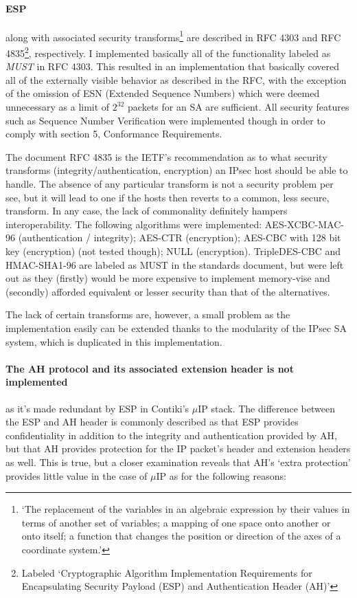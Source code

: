 \documentclass[final,a4paper,twoside,11pt,onecolumn]{report}
\begin{document}
\paragraph{ESP} along with associated security transforms\footnote{`The replacement of the variables in an algebraic expression by their values in terms of another set of variables; a mapping of one space onto another or onto itself; a function that changes the position or direction of the axes of a coordinate system.'\cite{wiki:transforms}} are described in RFC 4303\cite{rfc4303} and RFC 4835\cite{rfc4835}\footnote{Labeled `Cryptographic Algorithm Implementation Requirements for Encapsulating Security Payload (ESP) and Authentication Header (AH)'}, respectively. I implemented basically all of the functionality labeled as \emph{MUST} in RFC 4303. This resulted in an implementation that basically covered all of the externally visible behavior as described in the RFC, with the exception of the omission of ESN (Extended Sequence Numbers) which were deemed unnecessary as a limit of $2^{32}$ packets for an SA are sufficient. All security features such as Sequence Number Verification\citep[3.4.3]{rfc4303} were implemented though in order to comply with section 5, Conformance Requirements\citep[section 5]{rfc4303}.

The document RFC 4835 is the IETF's recommendation as to what security transforms (integrity/authentication, encryption) an IPsec host should be able to handle. The absence of any particular transform is not a security problem per see, but it will lead to one if the hosts then reverts to a common, less secure, transform. In any case, the lack of commonality definitely hampers interoperability. The following algorithms were implemented: AES-XCBC-MAC-96\cite{rfc3566} (authentication / integrity); AES-CTR\cite{rfc3686} (encryption); AES-CBC with 128 bit key\cite{rfc3602} (encryption) (not tested though); NULL\cite{rfc2410} (encryption). TripleDES-CBC\cite{rfc2451} and HMAC-SHA1-96\cite{rfc2404} are labeled as MUST in the standards document\cite{rfc4835}, but were left out as they (firstly) would be more expensive to implement memory-vise and (secondly) afforded equivalent or lesser security than that of the alternatives.

The lack of certain transforms are, however, a small problem as the implementation easily can be extended thanks to the modularity of the IPsec SA system, which is duplicated in this implementation.

\paragraph{The AH protocol and its associated extension header is not implemented} as it's made redundant by ESP in Contiki's $\mu$IP stack.
\label{para:ah-not-impl}
The difference between the ESP and AH header is commonly described as that ESP provides confidentiality in addition to the integrity and authentication provided by AH, but that AH provides protection for the IP packet's header and extension headers as well. This is true, but a closer examination reveals that AH's `extra protection' provides little value in the case of $\mu$IP as for the following reasons:
\end{document}
